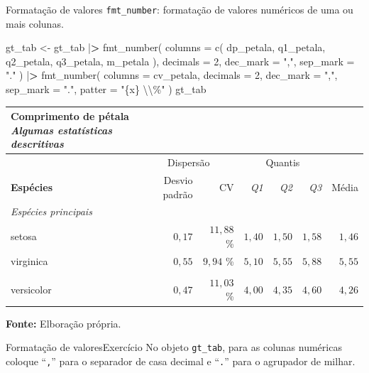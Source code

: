 \documentclass[
  10pt,
  ignorenonframetext,
]{beamer}
\newenvironment{Shaded}{}{}
\newcommand{\CharTok}[1]{\textcolor[rgb]{0.00,0.50,0.50}{#1}}
\newcommand{\DataTypeTok}[1]{#1}
\newcommand{\DecValTok}[1]{#1}
\newcommand{\ErrorTok}[1]{\textcolor[rgb]{1.00,0.00,0.00}{\textbf{#1}}}
\newcommand{\KeywordTok}[1]{\textcolor[rgb]{0.00,0.00,1.00}{#1}}
\newcommand{\NormalTok}[1]{#1}
\newcommand{\OperatorTok}[1]{#1}
\newcommand{\StringTok}[1]{\textcolor[rgb]{0.00,0.50,0.50}{#1}}
\begin{document}
\begin{frame}[fragile]{Formatação de valores}
\protect\hypertarget{formatauxe7uxe3o-de-valores}{}
\texttt{fmt\_number}: formatação de valores numéricos de uma ou mais
colunas.

\begin{Shaded}
\begin{Highlighting}[]
\NormalTok{gt\_tab \textless{}{-}}\StringTok{ }\NormalTok{gt\_tab }\OperatorTok{|}\ErrorTok{\textgreater{}}
\StringTok{  }\KeywordTok{fmt\_number}\NormalTok{(}
    \DataTypeTok{columns =} \KeywordTok{c}\NormalTok{(}
\NormalTok{      dp\_petala, q1\_petala, q2\_petala,}
\NormalTok{      q3\_petala, m\_petala}
\NormalTok{    ),}
    \DataTypeTok{decimals =} \DecValTok{2}\NormalTok{,}
    \DataTypeTok{dec\_mark =} \StringTok{","}\NormalTok{,}
    \DataTypeTok{sep\_mark =} \StringTok{"."}
\NormalTok{  ) }\OperatorTok{|}\ErrorTok{\textgreater{}}
\StringTok{  }\KeywordTok{fmt\_number}\NormalTok{(}
    \DataTypeTok{columns =}\NormalTok{ cv\_petala,}
    \DataTypeTok{decimals =} \DecValTok{2}\NormalTok{,}
    \DataTypeTok{dec\_mark =} \StringTok{","}\NormalTok{,}
    \DataTypeTok{sep\_mark =} \StringTok{"."}\NormalTok{,}
    \DataTypeTok{patter =} \StringTok{"\{x\} }\CharTok{\textbackslash{}\textbackslash{}}\StringTok{\%"}
\NormalTok{  )}
\NormalTok{gt\_tab}
\end{Highlighting}
\end{Shaded}
\end{frame}

\begin{frame}
\setlength{\LTpost}{0mm}
\begin{longtable}{lrrrrrr}
\caption*{
{\large \textbf{Comprimento de pétala}} \\ 
{\small \emph{Algumas estatísticas descritivas}}
} \\ 
\toprule
 & \multicolumn{2}{c}{Dispersão} & \multicolumn{3}{c}{Quantis} &  \\ 
\cmidrule(lr){2-3} \cmidrule(lr){4-6}
\textbf{Espécies} & Desvio padrão & CV & \emph{Q1} & \emph{Q2} & \emph{Q3} & Média \\ 
\midrule
\multicolumn{7}{l}{\emph{Espécies principais}} \\ 
\midrule
setosa & $0,17$ & $11,88$ \% & $1,40$ & $1,50$ & $1,58$ & $1,46$ \\ 
virginica & $0,55$ & $9,94$ \% & $5,10$ & $5,55$ & $5,88$ & $5,55$ \\ 
\midrule
\multicolumn{7}{l}{\vspace*{-5mm}} \\ 
versicolor & $0,47$ & $11,03$ \% & $4,00$ & $4,35$ & $4,60$ & $4,26$ \\ 
\bottomrule
\end{longtable}
\begin{minipage}{\linewidth}
\textbf{Fonte:} Elboração própria.\\
\end{minipage}
\end{frame}

\begin{frame}[fragile]{Formatação de valores\newline Exercício}
\protect\hypertarget{formatauxe7uxe3o-de-valoresexercuxedcio}{}
No objeto \texttt{gt\_tab}, para as colunas numéricas coloque
``\texttt{,}'' para o separador de casa decimal e ``\texttt{.}'' para o
agrupador de milhar.
\end{frame}
\end{document}
